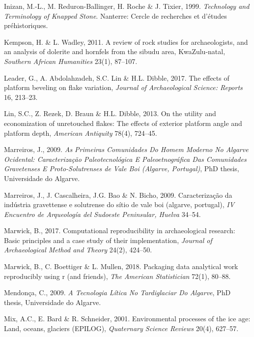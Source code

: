 \documentclass[12pt,twoside]{reedthesis}
\begin{document}
\leavevmode\hypertarget{ref-inizan1999}{}%
Inizan, M.-L., M. Reduron-Ballinger, H. Roche \& J. Tixier, 1999. \emph{Technology and Terminology of Knapped Stone}. Nanterre: Cercle de recherches et d'études préhistoriques.

\leavevmode\hypertarget{ref-kempson2011}{}%
Kempson, H. \& L. Wadley, 2011. A review of rock studies for archaeologists, and an analysis of dolerite and hornfels from the sibudu area, KwaZulu-natal, \emph{Southern African Humanities} 23(1), 87--107.

\leavevmode\hypertarget{ref-leader2017}{}%
Leader, G., A. Abdolahzadeh, S.C. Lin \& H.L. Dibble, 2017. The effects of platform beveling on flake variation, \emph{Journal of Archaeological Science: Reports} 16, 213--23.

\leavevmode\hypertarget{ref-linetal2013}{}%
Lin, S.C., Z. Rezek, D. Braun \& H.L. Dibble, 2013. On the utility and economization of unretouched flakes: The effects of exterior platform angle and platform depth, \emph{American Antiquity} 78(4), 724--45.

\leavevmode\hypertarget{ref-marreiros2009}{}%
Marreiros, J., 2009. \emph{\textup{As Primeiras Comunidades Do Homem Moderno No Algarve Ocidental: Caracterização Paleotecnológica E Paleoetnográfica Das Comunidades Gravetenses E Proto-Solutrenses de Vale Boi (Algarve, Portugal)}}, PhD thesis, Universidade do Algarve.

\leavevmode\hypertarget{ref-marreirosetal2009}{}%
Marreiros, J., J. Cascalheira, J.G. Bao \& N. Bicho, 2009. Caracterização da indústria gravettense e solutrense do sítio de vale boi (algarve, portugal), \emph{IV Encuentro de Arqueología del Sudoeste Peninsular, Huelva} 34--54.

\leavevmode\hypertarget{ref-marwick2017}{}%
Marwick, B., 2017. Computational reproducibility in archaeological research: Basic principles and a case study of their implementation, \emph{Journal of Archaeological Method and Theory} 24(2), 424--50.

\leavevmode\hypertarget{ref-marwick2018}{}%
Marwick, B., C. Boettiger \& L. Mullen, 2018. Packaging data analytical work reproducibly using r (and friends), \emph{The American Statistician} 72(1), 80--88.

\leavevmode\hypertarget{ref-mendonca2009}{}%
Mendonça, C., 2009. \emph{\textup{A Tecnologia Lítica No Tardiglaciar Do Algarve}}, PhD thesis, Universidade do Algarve.

\leavevmode\hypertarget{ref-mix2001}{}%
Mix, A.C., E. Bard \& R. Schneider, 2001. Environmental processes of the ice age: Land, oceans, glaciers (EPILOG), \emph{Quaternary Science Reviews} 20(4), 627--57.
\end{document}
